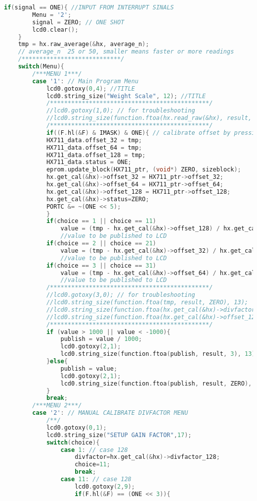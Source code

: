 \begin{lstlisting}[language=C, caption={main.c}, label=main-c, captionpos=b]
	if(signal == ONE){ //INPUT FROM INTERRUPT SINALS
		Menu = '2';
		signal = ZERO; // ONE SHOT
		lcd0.clear();
	}
	tmp = hx.raw_average(&hx, average_n); 
	// average_n  25 or 50, smaller means faster or more readings
	/****************************/
	switch(Menu){
		/***MENU 1***/
		case '1': // Main Program Menu
			lcd0.gotoxy(0,4); //TITLE
			lcd0.string_size("Weight Scale", 12); //TITLE
			/*********************************************/
			//lcd0.gotoxy(1,0); // for troubleshooting
			//lcd0.string_size(function.ftoa(hx.read_raw(&hx), result, ZERO), 13);
			/*********************************************/
			if((F.hl(&F) & IMASK) & ONE){ // calibrate offset by pressing button 1
			HX711_data.offset_32 = tmp;
			HX711_data.offset_64 = tmp;
			HX711_data.offset_128 = tmp;
			HX711_data.status = ONE;
			eprom.update_block(HX711_ptr, (void*) ZERO, sizeblock);
			hx.get_cal(&hx)->offset_32 = HX711_ptr->offset_32;
			hx.get_cal(&hx)->offset_64 = HX711_ptr->offset_64;
			hx.get_cal(&hx)->offset_128 = HX711_ptr->offset_128;
			hx.get_cal(&hx)->status=ZERO;
			PORTC &= ~(ONE << 5);
			}
			if(choice == 1 || choice == 11)
				value = (tmp - hx.get_cal(&hx)->offset_128) / hx.get_cal(&hx)->divfactor_128; 
				//value to be published to LCD
			if(choice == 2 || choice == 21)
				value = (tmp - hx.get_cal(&hx)->offset_32) / hx.get_cal(&hx)->divfactor_32; 
				//value to be published to LCD
			if(choice == 3 || choice == 31)
				value = (tmp - hx.get_cal(&hx)->offset_64) / hx.get_cal(&hx)->divfactor_64; 
				//value to be published to LCD
			/*********************************************/
			//lcd0.gotoxy(3,0); // for troubleshooting
			//lcd0.string_size(function.ftoa(tmp, result, ZERO), 13);
			//lcd0.string_size(function.ftoa(hx.get_cal(&hx)->divfactor_128, result, ZERO), 13);
			//lcd0.string_size(function.ftoa(hx.get_cal(&hx)->offset_128, result, ZERO), 13);
			/*********************************************/
			if (value > 1000 || value < -1000){
				publish = value / 1000;
				lcd0.gotoxy(2,1);
				lcd0.string_size(function.ftoa(publish, result, 3), 13); lcd0.string_size("Kg", 4);
			}else{
				publish = value;
				lcd0.gotoxy(2,1);
				lcd0.string_size(function.ftoa(publish, result, ZERO), 13); lcd0.string_size("gram", 4);
			}
			break;
		/***MENU 2***/
		case '2': // MANUAL CALIBRATE DIVFACTOR MENU
			/**/
			lcd0.gotoxy(0,1);
			lcd0.string_size("SETUP GAIN FACTOR",17);
			switch(choice){
				case 1: // case 128
					divfactor=hx.get_cal(&hx)->divfactor_128;
					choice=11;
					break;
				case 11: // case 128
					lcd0.gotoxy(2,9);
					if(F.hl(&F) == (ONE << 3)){

\end{lstlisting}
